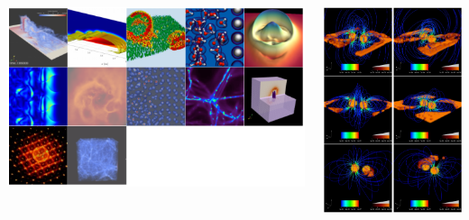 \begin{frame}
\begin{columns}
\begin{column}{5.325cm}
	\vspace{-5mm}
	\href{https://www.computecanada.ca/research-portal/national-services/visualization/}{\includegraphics[width=.99\columnwidth]{figs/plots/others/CC-viz_examples}}
    \end{column}
    \begin{column}{7.5cm}
	\vspace{1.25mm}
        \includegraphics[width=\columnwidth,clip=true,trim=0 4cm 0 4cm]{figs/plots/mpc/plot_Bxi}

\end{column}
\end{columns}
\end{frame}

